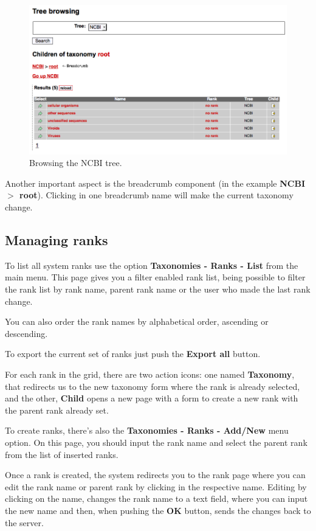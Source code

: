 \begin{figure}[H]
  \centering
    \includegraphics[scale=0.4]{tree_browsing.png}
  \caption{Browsing the NCBI tree.}
  \label{fig:tree_browsing}
\end{figure}

Another important aspect is the breadcrumb component (in the example \textbf{NCBI $>$ root}). Clicking
in one breadcrumb name will make the current taxonomy change.

\subsection{Managing ranks}

To list all system ranks use the option \textbf{Taxonomies - Ranks - List} from the main menu.
This page gives you a filter enabled rank list, being possible to filter the rank list by
rank name, parent rank name or the user who made the last rank change.

You can also order the rank names by alphabetical order, ascending or descending.

To export the current set of ranks just push the \textbf{Export all} button.

For each rank in the grid, there are two action icons: one named \textbf{Taxonomy}, that redirects us
to the new taxonomy form where the rank is already selected, and the other, \textbf{Child}
opens a new page with a form to create a new rank with the parent rank already set.

To create ranks, there's also the \textbf{Taxonomies - Ranks - Add/New} menu option.
On this page, you should input the rank name and select the parent rank from the list of inserted ranks.

Once a rank is created, the system redirects you to the rank page where you can edit the rank name
or parent rank by clicking in the respective name. Editing by clicking on the name, changes the rank name
to a text field, where you can input the new name and then, when pushing the \textbf{OK} button, sends the
changes back to the server.

